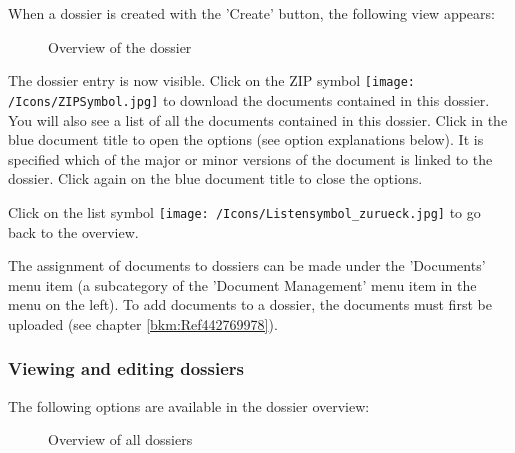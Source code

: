 \vspace{\baselineskip}

When a dossier is created with the 'Create' button, the following view appears:

\begin{figure}[H]
\caption{Overview of the dossier}
\end{figure}

The dossier entry is now visible. Click on the ZIP symbol \texttt{[image: /Icons/ZIPSymbol.jpg]}  to download the documents contained in this dossier. You will also see a list of all the documents contained in this dossier. Click in the blue document title  to open the options (see option explanations below). It is specified which of the major or minor versions of the document is linked to the dossier. Click again on the blue document title to close the options.

Click on the list symbol \texttt{[image: /Icons/Listensymbol\_zurueck.jpg]}  to go back to the overview.

\vspace{\baselineskip}

The assignment of documents to dossiers can be made under the 'Documents' menu item (a subcategory of the 'Document Management' menu item in the menu on the left). To add documents to a dossier, the documents must first be uploaded (see chapter \ref{bkm:Ref442769978}).

\subsubsection{Viewing and editing dossiers}

The following options are available in the dossier overview:

\begin{figure}[H]
\caption{Overview of all dossiers}
\end{figure}

